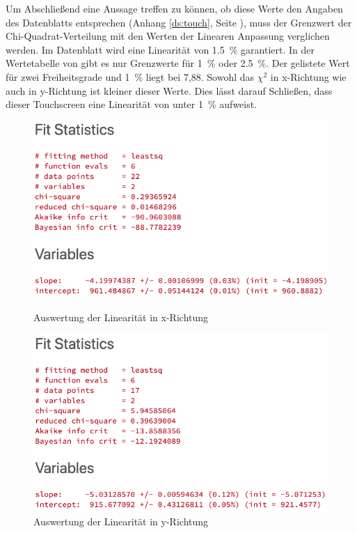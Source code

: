 Um Abschließend eine Aussage treffen zu können, ob diese Werte den Angaben des Datenblatts entsprechen (Anhang \ref{ds:touch}, Seite \pageref{ds:touch}), muss der Grenzwert der Chi-Quadrat-Verteilung mit den Werten der Linearen Anpassung verglichen werden.
Im Datenblatt wird eine Linearität von \SI{1,5}{\%} garantiert. In der Wertetabelle von \cite{papula} gibt es nur Grenzwerte für \SI{1}{\%} oder \SI{2,5}{\%}. Der gelistete Wert für zwei Freiheitsgrade und \SI{1}{\%} liegt bei 7,88.
Sowohl das \(\chi^2\) in x-Richtung wie auch in y-Richtung ist kleiner dieser Werte. Dies lässt darauf Schließen, dass dieser Touchscreen eine Linearität von unter \SI{1}{\%} aufweist.
\begin{figure}
    \begin{minipage}{0.49\linewidth}
        \centering
        \includegraphics[width=\linewidth]{fig/xfit.png}
        \caption{Auswertung der Linearität in x-Richtung}
        \label{fig:xfit}
    \end{minipage}
    \begin{minipage}{0.49\linewidth}
        \centering
        \includegraphics[width=\linewidth]{fig/yfit.png}
        \caption{Auswertung der Linearität in y-Richtung}
        \label{fig:yfit}
    \end{minipage}
\end{figure} 
